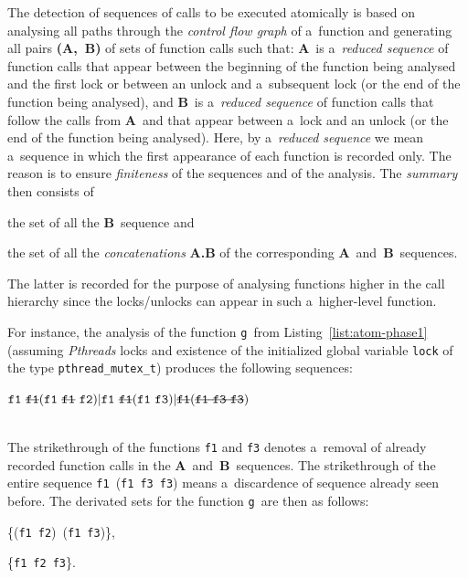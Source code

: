 \documentclass{ExcelAtFIT}
\begin{document}
The detection of sequences of calls to be
executed atomically is based on analysing all
paths through the \emph{control flow graph} of
a~function and generating all pairs
\textbf{(A,~B)} of sets of function
calls such that: \textbf{A}~is a~\emph{reduced
sequence} of function calls that appear
between the beginning of the function being
analysed and the first lock or between an
unlock and a~subsequent lock (or the end of the
function being analysed), and
\textbf{B}~is a~\emph{reduced sequence} of function
calls that follow the calls from
\textbf{A}~and that appear between a~lock
and an unlock (or the end of the function
being analysed). Here, by a~\emph{reduced sequence}
we mean a~sequence in which the first
appearance of each function is recorded only.
The reason is to ensure \emph{finiteness} of the
sequences and of the analysis. The \emph{summary}
then consists of
\begin{enumerate*}[label={(\roman*)}]
    \item
        the set of all the \textbf{B}~sequence
        and

    \item
        the set of all the \emph{concatenations}
        \textbf{A.B} of the corresponding
        \textbf{A}~and~\textbf{B}~sequences.
\end{enumerate*}
The latter is recorded for the purpose of
analysing functions higher in the call
hierarchy since the locks/unlocks can appear
in such a~higher-level function.

For instance, the analysis of the
function \texttt{g}~from
Listing~\ref{list:atom-phase1} (assuming
\emph{Pthreads} locks and existence of the
initialized global variable \texttt{lock} of
the type \texttt{pthr\-ead\_mutex\_t})
produces the following sequences:
\\[0.4em]
\centerline{$
    \text{\texttt{f1} \sout{\texttt{f1}}}
    (\text{\texttt{f1} \sout{\texttt{f1}} \texttt{f2}}) |
    \text{\texttt{f1} \sout{\texttt{f1}}}
    (\text{\texttt{f1} \texttt{f3}}) |
    \text{\sout{\texttt{f1}}}
    (\text{\sout{\texttt{f1} \texttt{f3} \texttt{f3}}})
$}
\\[0.4em]
The strikethrough of the functions \texttt{f1}
and \texttt{f3} denotes a~removal of 
already recorded function calls in the
\textbf{A}~and~\textbf{B}~sequences.
The strikethrough of the entire sequence
\texttt{f1}~(\texttt{f1}~\texttt{f3}~\texttt{f3})
means a~discardence of sequence already
seen before.
The derivated sets for the
function \texttt{g}~are then as follows:
\begin{enumerate*}[label={(\roman*)}, topsep=0.4em]
    \item
       \{(\texttt{f1}~\texttt{f2})~(\texttt{f1}~\texttt{f3})\},

    \item
        \{\texttt{f1}~\texttt{f2}~\texttt{f3}\}.
\end{enumerate*}
\end{document}
